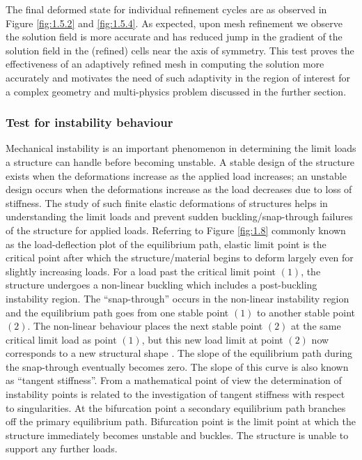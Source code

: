 \documentclass[11pt,a4paper,final]{article}
\begin{document}
The final deformed state for individual refinement cycles are as observed in Figure \eqref{fig:1.5.2} and \eqref{fig:1.5.4}. As expected, upon mesh refinement we observe the solution field is more accurate and has reduced jump in the gradient of the solution field in the (refined) cells near the axis of symmetry. This test proves the effectiveness of an adaptively refined mesh in computing the solution more accurately and motivates the need of such adaptivity in the region of interest for a complex geometry and multi-physics problem discussed in the further section.\par  

\subsubsection{Test for instability behaviour}

Mechanical instability is an important phenomenon in determining the limit loads a structure can handle before becoming unstable. A stable design of the structure exists when the deformations increase as the applied load increases; an unstable design occurs when the deformations increase as the load decreases due to loss of stiffness. The study of such finite elastic deformations of structures helps in understanding the limit loads and prevent sudden buckling/snap-through failures of the structure for applied loads. Referring to Figure \eqref{fig:1.8} commonly known as the load-deflection plot of the equilibrium path, elastic limit point is the critical point after which the structure/material begins to deform largely even for slightly increasing loads. For a load past the critical limit point $(1)$, the structure undergoes a non-linear buckling which includes a post-buckling instability region. The ``snap-through'' occurs in the non-linear instability region and the equilibrium path goes from one stable point $(1)$ to another stable point $(2)$. The non-linear behaviour places the next stable point $(2)$ at the same critical limit load as point $(1)$, but this new load limit at point $(2)$ now corresponds to a new structural shape \cite{Hrinda2010}. The slope of the equilibrium path during the snap-through eventually becomes zero. The slope of this curve is also known as ``tangent stiffness''. From a mathematical point of view the determination of instability points is related to the investigation of tangent stiffness with respect to singularities. At the bifurcation point a secondary equilibrium path branches off the primary equilibrium path. Bifurcation point is the limit point at which the structure immediately becomes unstable and buckles. The structure is unable to support any further loads. \par 
\end{document}
